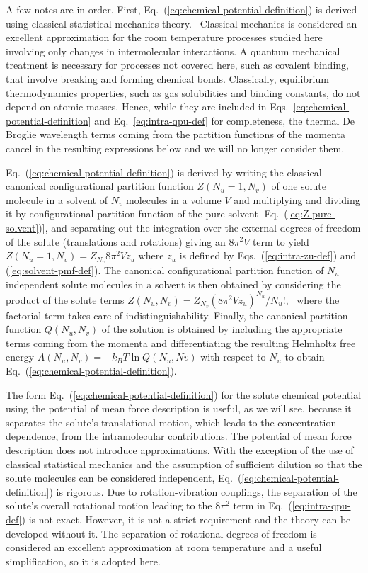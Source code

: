 \documentclass[9pt,bestpractices]{livecoms}
\begin{document}
A few notes are in order. First, Eq.~(\ref{eq:chemical-potential-definition}) is derived using classical statistical mechanics theory.~\cite{hill1986statthermo} Classical mechanics is considered an excellent approximation for the room temperature processes studied here involving only changes in intermolecular interactions. A quantum mechanical treatment is necessary for processes not covered here, such as covalent binding, that involve breaking and forming chemical bonds. Classically, equilibrium thermodynamics properties, such as gas solubilities and binding constants, do not depend on atomic masses. Hence, while they are included in Eqs.~\ref{eq:chemical-potential-definition} and Eq.~\ref{eq:intra-qpu-def} for completeness, the thermal De Broglie wavelength terms coming from the partition functions of the momenta cancel in the resulting expressions below and we will no longer consider them.

Eq.~(\ref{eq:chemical-potential-definition}) is derived by writing the classical canonical configurational partition function $Z(N_u = 1, N_v)$ of one solute molecule in a solvent of $N_v$ molecules in a volume $V$ and multiplying and dividing it by configurational partition function of the pure solvent [Eq.~(\ref{eq:Z-pure-solvent})], and separating out the integration over the external degrees of freedom of the solute (translations and rotations) giving an $8 \pi^2 V$ term to yield $Z(N_u = 1, N_v) = Z_{N_v} 8 \pi^2 V z_u$ where $z_u$ is defined by Eqs.~(\ref{eq:intra-zu-def}) and (\ref{eq:solvent-pmf-def}). The canonical configurational partition function of $N_u$ independent solute molecules in a solvent is then obtained by considering the product of the solute terms $Z(N_u, N_v) = Z_{N_v} (8 \pi^2 V z_u)^{N_u}/N_u!$,~\cite{guggenheim1952mixtures504,simonson2016physical} where the factorial term takes care of indistinguishability. Finally, the canonical partition function $Q(N_u, N_v)$ of the solution is obtained by including the appropriate terms coming from the momenta and differentiating the resulting Helmholtz free energy $A(N_u, N_v) = -k_B T \ln Q(N_u, Nv)$ with respect to $N_u$ to obtain Eq.~(\ref{eq:chemical-potential-definition}).

The form Eq.~(\ref{eq:chemical-potential-definition}) for the solute chemical potential using the potential of mean force description is useful, as we will see, because it separates the solute's translational motion, which leads to the concentration dependence, from the intramolecular contributions. The potential of mean force description does not introduce approximations. With the exception of the use of classical statistical mechanics and the assumption of sufficient dilution so that the solute molecules can be considered independent, Eq.~(\ref{eq:chemical-potential-definition}) is rigorous. Due to rotation-vibration couplings, the separation of the solute's overall rotational motion leading to the $8 \pi^2$ term in Eq.~(\ref{eq:intra-qpu-def}) is not exact. However, it is not a strict requirement and the theory can be developed without it. The separation of rotational degrees of freedom is considered an excellent approximation at room temperature and a useful simplification, so it is adopted here.
\end{document}
